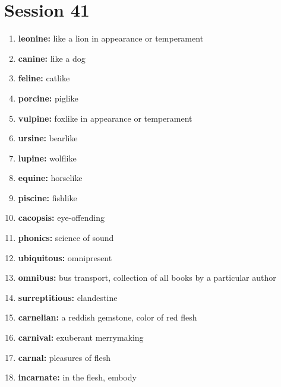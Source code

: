 \documentclass{article}
\begin{document}
\section{Session 41}
\begin{enumerate}
    \item \textbf{leonine: }{like a lion in appearance or temperament}
    \item \textbf{canine: }{like a dog}
    \item \textbf{feline: }{catlike}
    \item \textbf{porcine: }{piglike}
    \item \textbf{vulpine: }{foxlike in appearance or temperament}
    \item \textbf{ursine: }{bearlike}
    \item \textbf{lupine: }{wolflike}
    \item \textbf{equine: }{horselike}
    \item \textbf{piscine: }{fishlike}
    \item \textbf{cacopsis: }{eye-offending}
    \item \textbf{phonics: }{science of sound}
    \item \textbf{ubiquitous: }{omnipresent}
    \item \textbf{omnibus: }{bus transport, collection of all books by a particular author}
    \item \textbf{surreptitious: }{clandestine}
    \item \textbf{carnelian: }{a reddish gemstone, color of red flesh}
    \item \textbf{carnival: }{exuberant merrymaking}
    \item \textbf{carnal: }{pleasures of flesh}
    \item \textbf{incarnate: }{in the flesh, embody}
    
\end{enumerate}
\end{document}
